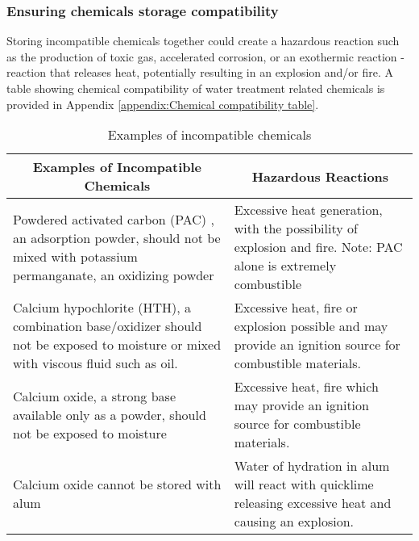 \subsubsection{Ensuring chemicals storage compatibility}

Storing incompatible chemicals together could create a hazardous reaction such as the production of toxic gas, accelerated corrosion, or an exothermic reaction - reaction that releases heat, potentially resulting in an explosion and/or fire. 
A table showing chemical compatibility of water treatment related chemicals is provided in Appendix \ref{appendix:Chemical compatibility table}.
\begin{table}[H]
\begin{tabular}{|m{7cm}|m{7cm}|}
\hline
\multicolumn{1}{|c|}{\textbf{Examples of Incompatible Chemicals}}                        & \multicolumn{1}{c|}{\textbf{Hazardous Reactions}} \\ \hline
Powdered activated carbon (PAC) \index{Powdered activated carbon (PAC)}, an adsorption powder, should not be mixed with potassium
permanganate, an oxidizing powder                                                            & Excessive heat generation, with the possibility of
explosion and fire. Note: PAC alone is extremely
combustible 
 \\ \hline
Calcium hypochlorite (HTH), a combination base/oxidizer
should not be exposed to moisture or mixed with
viscous fluid such as oil. & Excessive heat, fire or explosion possible and may
provide an ignition source for combustible materials.
            \\ \hline
Calcium oxide, a strong base available only as a
powder, should not be exposed to moisture & Excessive heat, fire which may provide an ignition source for combustible materials.
 \\ \hline
Calcium oxide cannot be stored with alum & Water of hydration in alum will react with quicklime releasing excessive heat and causing an explosion.
 \\ \hline
\end{tabular}
\caption{Examples of incompatible chemicals}
\label{table:Incompatiblechemicals}
\end{table}

